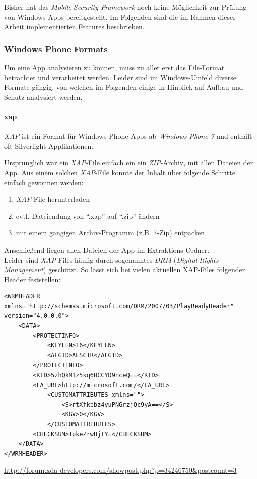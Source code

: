 Bisher hat das \textit{Mobile Security Framework} noch keine Möglichkeit zur Prüfung von Windows-Apps bereitgestellt. Im Folgenden sind die im Rahmen dieser Arbeit implementierten Features beschrieben.

\subsubsection{Windows Phone Formats}
Um eine App analysieren zu können, muss zu aller erst das File-Format betrachtet und verarbeitet werden. Leider sind im Windows-Umfeld diverse Formate gängig, von welchen im Folgenden einige in Hinblick auf Aufbau und Schutz analysiert werden.

\paragraph{xap}
\textit{XAP} ist ein Format für Windows-Phone-Apps ab \textit{Windows Phone 7} und enthält oft Silverlight-Applikationen.

Ursprünglich war ein \textit{XAP}-File einfach ein ein \textit{ZIP}-Archiv, mit allen Dateien der App. Aus einem solchen \textit{XAP}-File konnte der Inhalt über folgende Schritte einfach gewonnen werden:
\begin{enumerate}
	\item \textit{XAP}-File herunterladen
	\item evtl. Dateiendung von "`.xap"' auf "`.zip"' ändern
	\item mit einem gängigen Archiv-Programm (z.B. 7-Zip) entpacken
\end{enumerate}
Anschließend liegen allen Dateien der App im Extraktions-Ordner.\\

Leider sind \textit{XAP}-Files häufig durch sogenanntes \textit{DRM} (\textit{Digital Rights Management}) geschützt. So lässt sich bei vielen aktuellen XAP-Files folgender Header feststellen:
\begin{lstlisting}
<WRMHEADER xmlns="http://schemas.microsoft.com/DRM/2007/03/PlayReadyHeader" version="4.0.0.0">
	<DATA>
		<PROTECTINFO>
			<KEYLEN>16</KEYLEN>
			<ALGID>AESCTR</ALGID>
		</PROTECTINFO>
		<KID>5zhQkM1z5kq6HCCYD9nceQ==</KID>
		<LA_URL>http://microsoft.com/</LA_URL>
			<CUSTOMATTRIBUTES xmlns="">
				<S>rtXfkbbz4yuPNGrzjQc9yA==</S>
				<KGV>0</KGV>
			</CUSTOMATTRIBUTES>
		<CHECKSUM>TpkeZrwUjIY=</CHECKSUM>
	</DATA>
</WRMHEADER>
\end{lstlisting}

\url{http://forum.xda-developers.com/showpost.php?p=34246750&postcount=3}


